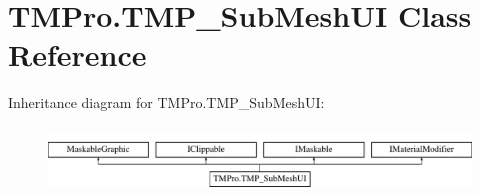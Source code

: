 \hypertarget{class_t_m_pro_1_1_t_m_p___sub_mesh_u_i}{}\section{T\+M\+Pro.\+T\+M\+P\+\_\+\+Sub\+Mesh\+UI Class Reference}
\label{class_t_m_pro_1_1_t_m_p___sub_mesh_u_i}
Inheritance diagram for T\+M\+Pro.\+T\+M\+P\+\_\+\+Sub\+Mesh\+UI\+:\begin{figure}[H]
\begin{center}
\leavevmode
\includegraphics[height=1.761006cm]{class_t_m_pro_1_1_t_m_p___sub_mesh_u_i}
\end{center}
\end{figure}
